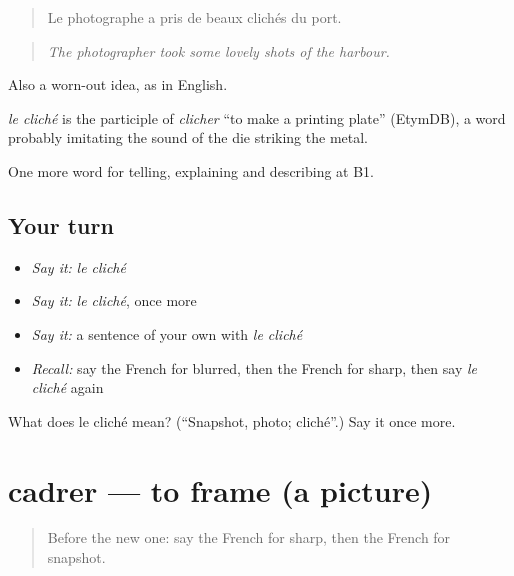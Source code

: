 \begin{quote}
Le photographe a pris de beaux clichés du port.
\end{quote}

\begin{quote}
\emph{The photographer took some lovely shots of the harbour.}
\end{quote}

Also a worn-out idea, as in English.

\begin{cousinweb}
\emph{le cliché} is the participle of \emph{clicher} \textquotedblleft{}to make a printing plate\textquotedblright{} (EtymDB), a word probably imitating the sound of the die striking the metal.
\end{cousinweb}

\begin{grammarlens}[title={What you've built}]
One more word for telling, explaining and describing at B1.
\end{grammarlens}

\subsection*{Your turn}
\begin{itemize}
\raggedright
  \item \emph{Say it:} \emph{le cliché}
  \item \emph{Say it:} \emph{le cliché}, once more
  \item \emph{Say it:} a sentence of your own with \emph{le cliché}
  \item \emph{Recall:} say the French for blurred, then the French for sharp, then say \emph{le cliché} again
\end{itemize}

\begin{tcolorbox}[breakable,colback=teal!4,colframe=teal!35!black,title={Before you move on}]
What does le cliché mean? (\textquotedblleft{}Snapshot, photo; cliché\textquotedblright{}.) Say it once more.
\end{tcolorbox}
\section[cadrer]{cadrer — to frame (a picture)}

\label{lesson:FR-C502-cadrer}



\begin{quote}
Before the new one: say the French for sharp, then the French for snapshot.
\end{quote}

